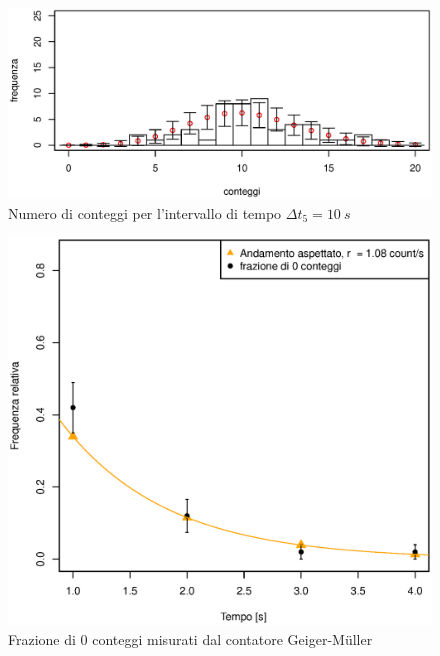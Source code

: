 \documentclass[10pt,oneside,a4paper]{article}
\begin{document}
\begin{figure}[H]
\caption{Numero di conteggi per l'intervallo di tempo $\Delta t_5 = \SI{10}{s}$}
\label{fig:istogramma_deltat5}
\centering
\includegraphics[scale=0.7]{ist_cinque_nuovo.eps}
\end{figure}


\begin{figure}[H]
\caption{Frazione di $0$ conteggi misurati dal contatore Geiger-Müller}
\label{fig:0conteggi}
\centering
\includegraphics[scale=0.7]{0.eps}
\end{figure}
\end{document}
